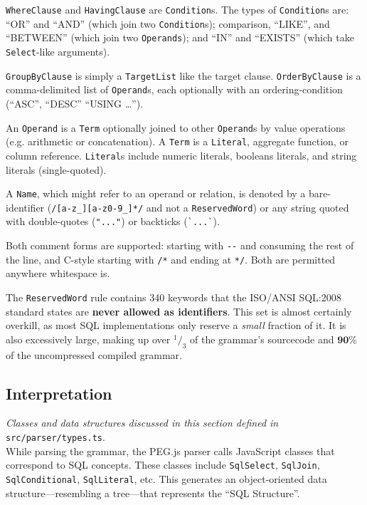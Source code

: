 \documentclass{article}
\begin{document}
\verb|WhereClause| and \verb|HavingClause| are \verb|Condition|s.
The types of \verb|Condition|s are: ``OR'' and ``AND'' (which join two
\verb|Condition|s); comparison, ``LIKE'', and ``BETWEEN'' (which join two
\verb|Operands|); and ``IN'' and ``EXISTS'' (which take \verb|Select|-like
arguments).

\verb|GroupByClause| is simply a \verb|TargetList| like the target clause.
\verb|OrderByClause| is a comma-delimited list of \verb|Operand|s, each optionally
with an ordering-condition (``ASC'', ``DESC'' ``USING \ldots'').

An \verb|Operand| is a \verb|Term| optionally joined to other \verb|Operand|s
by value operations (e.g. arithmetic or concatenation).
A \verb|Term| is a \verb|Literal|, aggregate function, or column reference.
\verb|Literal|s include numeric literals, booleans literals, and string literals
(single-quoted).

A \verb|Name|, which might refer to an operand or relation, is denoted by a
bare-identifier (\verb|/[a-z_][a-z0-9_]*/| and not a \verb|ReservedWord|) or any
string quoted with double-quotes (\verb|"..."|) or backticks (\verb|`...`|).

Both comment forms are supported: starting with \verb|--| and consuming the
rest of the line, and C-style starting with \verb|/*| and ending at \verb|*/|.
Both are permitted anywhere whitespace is.

The \verb|ReservedWord| rule contains 340 keywords that the ISO/ANSI SQL:2008
standard states are \textbf{never allowed as identifiers}. This set is almost
certainly overkill, as most SQL implementations only reserve a \emph{small}
fraction of it. It is also excessively large, making up over $^1/_3$ of the
grammar's sourcecode and $\textbf{90\%}$ of the uncompressed compiled grammar.

\subsection{Interpretation}

\emph{Classes and data structures discussed in this section defined in}
      \verb|src/parser/types.ts|. \\

While parsing the grammar, the PEG.js parser calls JavaScript classes that
correspond to SQL concepts.
These classes include \verb|SqlSelect|, \verb|SqlJoin|, \verb|SqlConditional|,
\verb|SqlLiteral|, etc.
This generates an object-oriented data structure---resembling a tree---that
represents the ``SQL Structure''.
\end{document}
